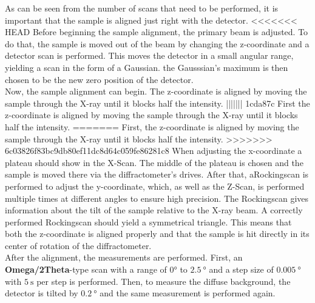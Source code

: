 As can be seen from the number of scans that need to be performed, it is important that the sample is aligned just right with the detector.
<<<<<<< HEAD
Before beginning the sample alignment, the primary beam is adjusted.
To do that, the sample is moved out of the beam by changing the z-coordinate and a detector scan is performed.
This moves the detector in a small angular range, yielding a scan in the form of a Gaussian.
the Gausssian's maximum is then chosen to be the new zero position of the detector. \\
Now, the sample alignment can begin.
The z-coordinate is aligned by moving the sample through the X-ray until it blocks half the intensity.
||||||| 1cda87c
First the z-coordinate is aligned by moving the sample through the X-ray until it blocks half the intensity.
=======
First, the z-coordinate is aligned by moving the sample through the X-ray until it blocks half the intensity.
>>>>>>> 6c03826f83bc9db80ef11dc8d64c059fe86281c8
When adjusting the x-coordinate a plateau should show in the X-Scan.
The middle of the plateau is chosen and the sample is moved there via the diffractometer's drives.
After that, aRockingscan is performed to adjust the y-coordinate, which, as well as the Z-Scan, is performed multiple times at
different angles to ensure high precision.
The Rockingscan gives information about the tilt of the sample relative to the X-ray beam.
A correctly performed Rockingscan should yield a symmetrical triangle.
This means that both the z-coordinate is aligned properly and that the sample is hit directly in its center of rotation of the diffractometer. \\

After the alignment, the measurements are performed.
First, an \textbf{Omega/2Theta}-type scan with a range of $0°$ to $\SI{2.5}{\degree}$ and a step size of $\SI{0.005}{\degree}$ with $\SI{5}{\second}$ per step is performed.
Then, to measure the diffuse background, the detector is tilted by $\SI{0.2}{\degree}$ and the same measurement is performed again.


